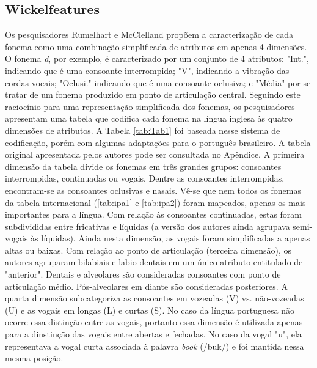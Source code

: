 \subsection{Wickelfeatures}
\label{sec:wickelfeatures}
Os pesquisadores Rumelhart e McClelland propõem a caracterização de cada fonema como uma combinação simplificada de atributos em apenas 4 dimensões. O fonema \textit{d}, por exemplo, é caracterizado por um conjunto de 4 atributos: "Int.", indicando que é uma consoante interrompida; "V", indicando a vibração das cordas vocais; "Oclusi."  indicando que é uma consoante oclusiva; e "Média" por se tratar de um fonema produzido em ponto de articulação central. Seguindo este raciocínio para uma representação simplificada dos fonemas, os pesquisadores apresentam uma tabela que codifica cada fonema na língua inglesa às quatro dimensões de atributos. A Tabela \ref{tab:Tab1} foi baseada nesse sistema de codificação, porém com algumas adaptações para o português brasileiro. A tabela original apresentada pelos autores pode ser consultada no Apêndice. A primeira dimensão da tabela divide os fonemas em três grandes grupos: consoantes interrompidas, continuadas ou vogais. Dentre as consoantes interrompidas, encontram-se as consoantes oclusivas e nasais. Vê-se que nem todos os fonemas da tabela internacional (\ref{tab:ipa1} e \ref{tab:ipa2}) foram mapeados, apenas os mais importantes para a língua. Com relação às consoantes continuadas, estas foram subdivididas entre fricativas e líquidas (a versão dos autores ainda agrupava semi-vogais às líquidas). Ainda nesta dimensão, as vogais foram simplificadas a apenas altas ou baixas.  Com relação ao ponto de articulação (terceira dimensão), os autores agruparam bilabiais e labio-dentais em um único atributo entitulado de "anterior". Dentais e alveolares são consideradas consoantes com ponto de articulação médio. Pós-alveolares em diante são consideradas posteriores. A quarta dimensão subcategoriza as consoantes em vozeadas (V) vs. não-vozeadas (U) e as vogais em longas (L) e curtas (S). No caso da língua portuguesa não ocorre essa distinção entre as vogais, portanto essa dimensão é utilizada apenas para a dinstinção das vogais entre abertas e fechadas. No caso da vogal "u", ela representava a vogal curta associada à palavra \textit{book} (/buk/) e foi mantida nessa mesma posição.

